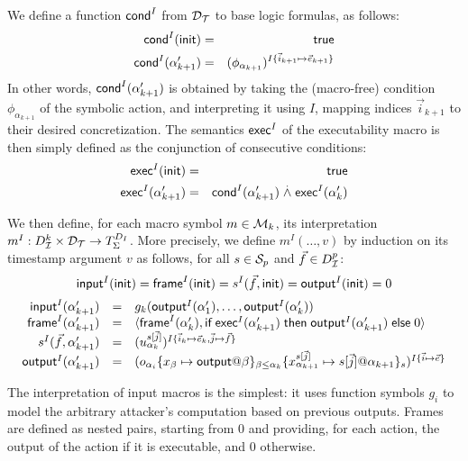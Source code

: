 We define a function $\textsf{cond}^I$ from $\mathcal{D}_{\mathcal{T}}$
to base logic formulas, as follows:
\begin{eqnarray*}
  \textsf{cond}^I(\mathsf{init}) &=& \textsf{true} \\
  \textsf{cond}^I(\alpha'_{k+1}) &=&
    (\phi_{\alpha_{k+1}})^{I\{\vec{i}_{k+1}\mapsto\vec{e}_{k+1}\}}
\end{eqnarray*}
In other words, $\textsf{cond}^I(\alpha'_{k+1})$ is obtained by taking the
(macro-free) condition $\phi_{\alpha_{k+1}}$ of the symbolic action, and 
interpreting it using $I$, mapping indices $\vec{i}_{k+1}$ to their
desired concretization.
The semantics $\textsf{exec}^I$ of the executability macro is then simply defined as 
the conjunction of consecutive conditions:
\begin{eqnarray*}
  \textsf{exec}^I(\mathsf{init}) &=& \textsf{true} \\
  \textsf{exec}^I(\alpha'_{k+1}) &=&
    \textsf{cond}^I(\alpha'_{k+1})
    \stackrel{.}{\wedge}
    \textsf{exec}^I(\alpha'_k)
\end{eqnarray*}

We then define, for each macro symbol $m\in\mathcal{M}_k$,
its interpretation $m^I : D_{\mathcal{I}}^k \times \mathcal{D}_{\mathcal{T}} \to T_\Sigma^{D_I}$.
More precisely, we define $m^I(\ldots,v)$ by induction on its timestamp 
argument $v$ as follows, for all $s \in \mathcal{S}_p$ and $\vec{f} \in D_{\mathcal{I}}^p$:
$$
    \textsf{input}^I(\mathsf{init}) = \textsf{frame}^I(\mathsf{init}) = s^I(\vec{f},\mathsf{init})
    = \textsf{output}^I(\mathsf{init}) = 0
$$
$$\begin{array}{rll}
    \minp^I(\alpha'_{k+1}) &=&
    g_{k}(\mout^I(\alpha'_1),\ldots,\mout^I(\alpha'_k))
  \\
    \mframe^I(\alpha'_{k+1}) &=&
    \langle \mframe^I(\alpha'_k),
    \myif \mexec^I(\alpha'_{k+1}) \mythen \mout^I(\alpha'_{k+1}) \myelse 0
    \rangle
  \\
    s^I(\vec{f},\alpha'_{k+1}) &=&
    \interp{
      u_{\alpha_{k}}^{s[\vec{j}]}
    }^{
      I\{\vec{i}_k\mapsto\vec{e}_k,\vec{j}\mapsto\vec{f}\}}
  \\
    \mout^I(\alpha'_{k+1}) &=&
      \interp{
        o_{\alpha_i}
        \{x_\beta\mapsto\mout@\beta\}_{\beta\leq \alpha_k}
        \{x_{\alpha_{k+1}}^{s[\vec{j}]}\mapsto 
          s[\vec{j}]@\alpha_{k+1}\}_s
        }^{I\{\vec{i}\mapsto\vec{e}\}}
\end{array}$$

The interpretation of input macros is the simplest:
it uses function symbols $g_i$ to model the arbitrary attacker's
computation based on previous outputs.
Frames are defined as nested pairs, starting from $0$ and
providing, for each action, the output of the action if it is executable,
and $0$ otherwise.

